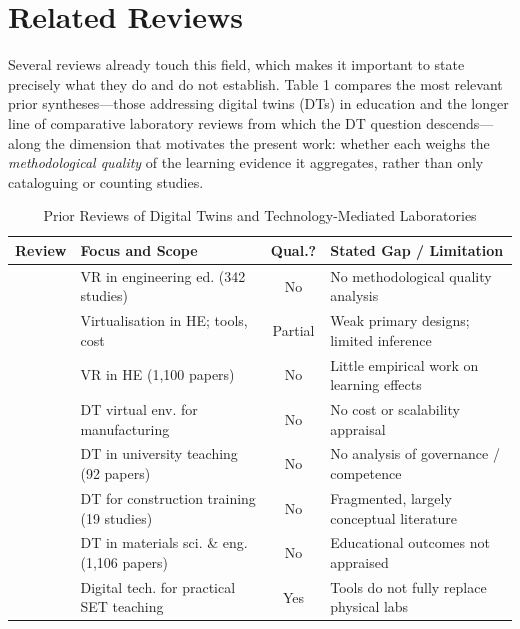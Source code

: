 \section{Related Reviews}\label{related-reviews}

Several reviews already touch this field, which makes it important to state
precisely what they do and do not establish. Table 1 compares the most relevant
prior syntheses---those addressing digital twins (DTs) in education and the longer
line of comparative laboratory reviews from which the DT question descends---along
the dimension that motivates the present work: whether each weighs the
\emph{methodological quality} of the learning evidence it aggregates, rather than only
cataloguing or counting studies.

\footnotesize
\begin{table}[!t]
	\renewcommand{\arraystretch}{1.2}
	\setlength{\tabcolsep}{3pt}
	\caption{Prior Reviews of Digital Twins and Technology-Mediated Laboratories}
	\label{tab:T1}
	\centering
	\scriptsize
	\begin{tabular}{@{} l p{3.0cm} c p{3.2cm} @{}}
		\hline
		\textbf{Review} & \textbf{Focus and Scope} & \textbf{Qual.?} & \textbf{Stated Gap / Limitation} \\ \hline
		\cite{lampropoulos_virtual_2025} & VR in engineering ed. (342 studies) & No & No methodological quality analysis \\
		\cite{tokhayeva_virtualisation_2026} & Virtualisation in HE; tools, cost & Partial & Weak primary designs; limited inference \\
		\cite{jiang_state_2026} & VR in HE (1,100 papers) & No & Little empirical work on learning effects \\
		\cite{kumar_karanam_systematic_2025} & DT virtual env. for manufacturing & No & No cost or scalability appraisal \\
		\cite{chamorro-atalaya_use_2024} & DT in university teaching (92 papers) & No & No analysis of governance / competence \\
		\cite{omrany_digital_2026} & DT for construction training (19 studies) & No & Fragmented, largely conceptual literature \\
		\cite{vergara_decade_2025} & DT in materials sci. \& eng. (1,106 papers) & No & Educational outcomes not appraised \\
		\cite{maladzhi_digital_2025} & Digital tech. for practical SET teaching & Yes & Tools do not fully replace physical labs \\

\end{tabular}
\end{table}

